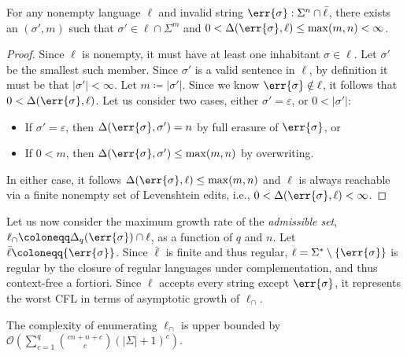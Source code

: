 \documentclass[runningheads]{llncs}
\begin{document}
  \begin{lemma}\label{lemma:upper-bound}
  For any nonempty language $\ell$ and invalid string $\err{\sigma}: \Sigma^n \cap \bar\ell$, there exists an $(\sigma', m)$ such that $\sigma' \in \ell\cap\Sigma^m$ and $0 < \Delta(\err{\sigma}, \ell) \leq \max(m, n) < \infty$.
  \end{lemma}

  \begin{proof}
    Since $\ell$ is nonempty, it must have at least one inhabitant $\sigma \in \ell$. Let $\sigma'$ be the smallest such member. Since $\sigma'$ is a valid sentence in $\ell$, by definition it must be that $|\sigma'|<\infty$. Let $m\coloneqq|\sigma'|$. Since we know $\err{\sigma} \notin \ell$, it follows that $0 < \Delta(\err{\sigma}, \ell)$. Let us consider two cases, either $\sigma' = \varepsilon$, or $0 < |\sigma'|$:

    \begin{itemize}
      \item If $\sigma' = \varepsilon$, then $\Delta(\err{\sigma}, \sigma') = n$ by full erasure of $\err{\sigma}$, or
      \item If $0 < m$, then $\Delta(\err{\sigma}, \sigma') \leq \max(m, n)$ by overwriting.
    \end{itemize}

    In either case, it follows $\Delta(\err{\sigma}, \ell) \leq \max(m, n)$ and $\ell$ is always reachable via a finite nonempty set of Levenshtein edits, i.e., $0 < \Delta(\err{\sigma}, \ell) < \infty$.
  \end{proof}

  Let us now consider the maximum growth rate of the \textit{admissible set}, $\ell_\cap \coloneqq \Delta_q(\err{\sigma}) \cap \ell$, as a function of $q$ and $n$. Let $\bar\ell \coloneqq \{\err{\sigma}\}$. Since $\bar\ell$ is finite and thus regular, $\ell = \Sigma^* \setminus \{\err{\sigma}\}$ is regular by the closure of regular languages under complementation, and thus context-free a fortiori. Since $\ell$ accepts every string except $\err{\sigma}$, it represents the worst CFL in terms of asymptotic growth of $\ell_\cap$.

  \begin{lemma}\label{lemma:interleaving}
  The complexity of enumerating $\ell_\cap$ is upper bounded by $\mathcal{O}\left(\sum_{c=1}^q{{cn + n + c} \choose c}(|\Sigma| + 1)^c\right)$.
  \end{lemma}
\end{document}
